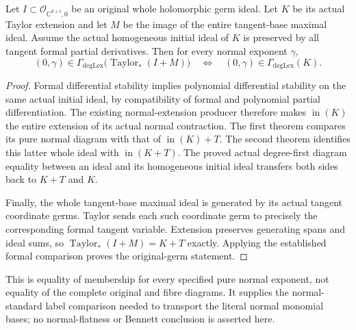 \begin{theorem}
\label{hir:actual-normal-fibre-diagram-original-comparison}
\leanok
{}
Let $I\subset\mathcal O_{\mathbb C^{d+t},0}$ be an original whole
holomorphic germ ideal. Let $K$ be its actual Taylor extension and let
$M$ be the image of the entire tangent-base maximal ideal. Assume the
actual homogeneous initial ideal of $K$ is preserved by all tangent
formal partial derivatives. Then for every normal exponent $\gamma$,
\[
 (0,\gamma)\in\Gamma_{\mathrm{degLex}}
   \bigl(\operatorname{Taylor}_*(I+M)\bigr)
 \quad\Longleftrightarrow\quad
 (0,\gamma)\in\Gamma_{\mathrm{degLex}}(K).
\]
\end{theorem}
\begin{proof}
Formal differential stability implies polynomial differential stability
on the same actual initial ideal, by compatibility of formal and
polynomial partial differentiation. The existing normal-extension
producer therefore makes $\operatorname{in}(K)$ the entire extension
of its actual normal contraction. The first theorem compares its pure
normal diagram with that of $\operatorname{in}(K)+T$. The second
theorem identifies this latter whole ideal with
$\operatorname{in}(K+T)$. The proved actual degree-first diagram equality
between an ideal and its homogeneous initial ideal transfers both sides
back to $K+T$ and $K$.

Finally, the whole tangent-base maximal ideal is generated by its
actual tangent coordinate germs. Taylor sends each such coordinate germ
to precisely the corresponding formal tangent variable. Extension
preserves generating spans and ideal sums, so
$\operatorname{Taylor}_*(I+M)=K+T$ exactly. Applying the established
formal comparison proves the original-germ statement.
\end{proof}

This is equality of membership for every specified pure normal exponent,
not equality of the complete original and fibre diagrams. It supplies the
normal-standard label comparison needed to transport the literal normal
monomial bases; no normal-flatness or Bennett conclusion is asserted here.
